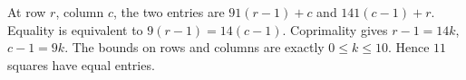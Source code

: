 At row $r$, column $c$, the two entries are $91(r-1)+c$ and $141(c-1)+r$. Equality is equivalent to $9(r-1)=14(c-1)$. Coprimality gives $r-1=14k$, $c-1=9k$. The bounds on rows and columns are exactly $0\le k\le10$. Hence $\boxed{11}$ squares have equal entries.
